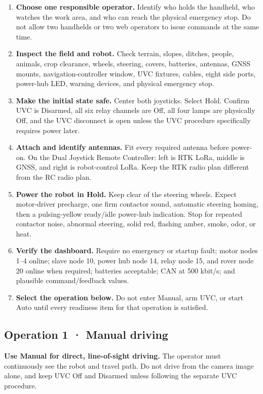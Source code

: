 \documentclass[
  10pt,
  letterpaper,
  openany]{report}
\providecommand{\tightlist}{%
  \setlength{\itemsep}{0pt}\setlength{\parskip}{0pt}}
\begin{document}
\begin{enumerate}
\tightlist
\item
  \textbf{Choose one responsible operator.} Identify who holds the
  handheld, who watches the work area, and who can reach the physical
  emergency stop. Do not allow two handhelds or two web operators to
  issue commands at the same time.
\item
  \textbf{Inspect the field and robot.} Check terrain, slopes, ditches,
  people, animals, crop clearance, wheels, steering, covers, batteries,
  antennas, GNSS mounts, navigation-controller window, UVC fixtures,
  cables, eight side ports, power-hub LED, warning devices, and physical
  emergency stop.
\item
  \textbf{Make the initial state safe.} Center both joysticks. Select
  Hold. Confirm UVC is Disarmed, all six relay channels are Off, all
  four lamps are physically Off, and the UVC disconnect is open unless
  the UVC procedure specifically requires power later.
\item
  \textbf{Attach and identify antennas.} Fit every required antenna
  before power-on. On the Dual Joystick Remote Controller: left is RTK
  LoRa, middle is GNSS, and right is robot-control LoRa. Keep the RTK
  radio plan different from the RC radio plan.
\item
  \textbf{Power the robot in Hold.} Keep clear of the steering wheels.
  Expect motor-driver precharge, one firm contactor sound, automatic
  steering homing, then a pulsing-yellow ready/idle power-hub
  indication. Stop for repeated contactor noise, abnormal steering,
  solid red, flashing amber, smoke, odor, or heat.
\item
  \textbf{Verify the dashboard.} Require no emergency or startup fault;
  motor nodes 1--4 online; slave node 10, power hub node 14, relay node
  15, and rover node 20 online when required; batteries acceptable; CAN
  at 500 kbit/s; and plausible command/feedback values.
\item
  \textbf{Select the operation below.} Do not enter Manual, arm UVC, or
  start Auto until every readiness item for that operation is satisfied.
\end{enumerate}

\subsection{Operation 1 · Manual driving}\label{operations-manual}

\begin{manualwarning}

\textbf{Use Manual for direct, line-of-sight driving.} The operator must
continuously see the robot and travel path. Do not drive from the camera
image alone, and keep UVC Off and Disarmed unless following the separate
UVC procedure.

\end{manualwarning}
\end{document}
